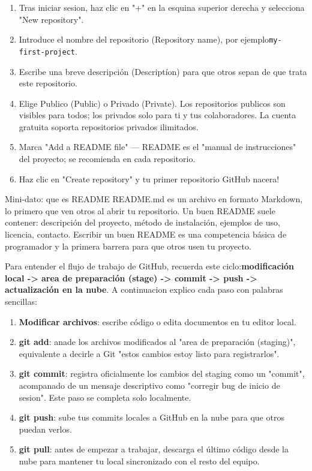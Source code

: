 
\begin{enumerate}
  \item Tras iniciar sesion, haz clic en "+" en la esquina superior derecha y selecciona "New repository".
  \item Introduce el nombre del repositorio (Repository name), por ejemplo\texttt{my-\allowbreak first-\allowbreak project}.
  \item Escribe una breve descripción (Descriptíon) para que otros sepan de que trata este repositorio.
  \item Elige Publico (Public) o Privado (Private). Los repositorios publicos son visibles para todos; los privados solo para ti y tus colaboradores. La cuenta gratuita soporta repositorios privados ilimitados.
  \item Marca "Add a README file" — README es el "manual de instrucciones" del proyecto; se recomienda en cada repositorio.
  \item Haz clic en "Create repository" y tu primer repositorio GitHub nacera!
\end{enumerate}

\begin{tcbinfo}{Mini-dato: que es README}
README.md es un archivo en formato Markdown, lo primero que ven otros al abrir tu repositorio. Un buen README suele contener: descripción del proyecto, método de instalación, ejemplos de uso, licencia, contacto. Escribir un buen README es una competencia básica de programador y la primera barrera para que otros usen tu proyecto.

\end{tcbinfo}


Para entender el flujo de trabajo de GitHub, recuerda este ciclo:\textbf{modificación local -> area de preparación (stage) -> commit -> push -> actualización en la nube}. A continuacion explico cada paso con palabras sencillas:

\begin{enumerate}
  \item \textbf{Modificar archivos}: escribe código o edita documentos en tu editor local.
  \item \textbf{git add}: anade los archivos modificados al "area de preparación (staging)", equivalente a decirle a Git "estos cambios estoy listo para registrarlos".
  \item \textbf{git commit}: registra oficialmente los cambios del staging como un "commit", acompanado de un mensaje descriptivo como "corregir bug de inicio de sesion". Este paso se completa solo localmente.
  \item \textbf{git push}: sube tus commits locales a GitHub en la nube para que otros puedan verlos.
  \item \textbf{git pull}: antes de empezar a trabajar, descarga el último código desde la nube para mantener tu local sincronizado con el resto del equipo.
\end{enumerate}

